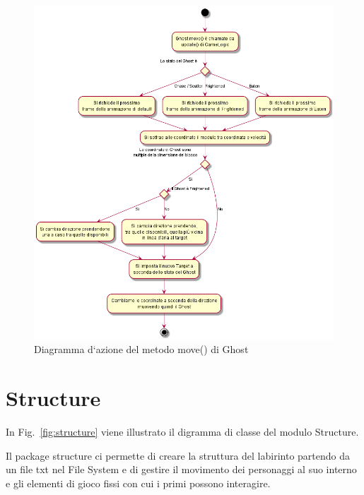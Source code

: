 \documentclass[12pt,a4paper]{report}
\begin{document}
\begin{figure}[tbp]
\begin{center}
 \centerline{ \includegraphics[width=17cm]{ghost_move}}
\end{center}
  \caption{Diagramma d`azione del metodo move() di Ghost}
  \label{fig:ghost_move}
\end{figure}

\newpage


\section{Structure}\label{se:arch.structure}
In Fig.~\ref{fig:structure} viene illustrato il digramma di classe del modulo Structure.\newline

Il package structure ci permette di creare la struttura del labirinto partendo da un file txt nel File System e di gestire il movimento dei personaggi al suo interno e gli elementi di gioco fissi con cui i primi possono interagire.
\end{document}
